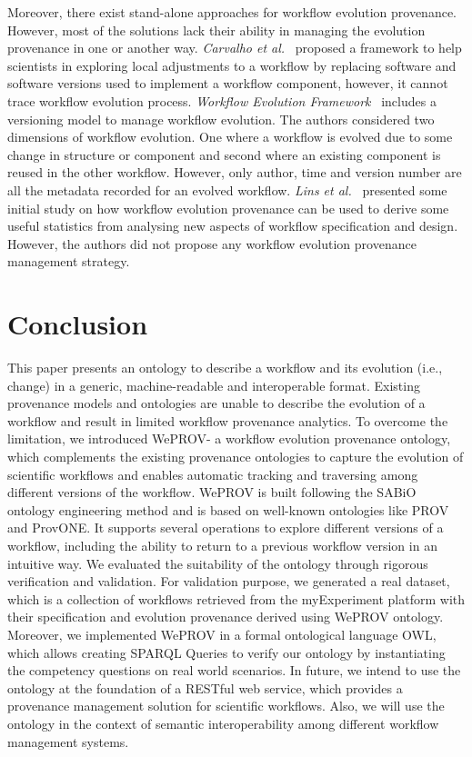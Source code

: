 \documentclass[ao]{iosart2x}
\begin{document}
Moreover, there exist stand-alone approaches for workflow evolution provenance. However, most of the solutions lack their ability in managing the evolution provenance in one or another way. 
\textit{Carvalho et al.}~\citep{carvalho2018semantic} proposed a framework to help scientists in exploring local adjustments to a workflow by replacing software and software versions used to implement a workflow component, however, it cannot trace workflow evolution process. 
\textit{Workflow Evolution Framework}~\citep{barga2010provenance, withana2010versioning} includes a versioning model to manage workflow evolution. The authors considered two dimensions of workflow evolution. One where a workflow is evolved due to some change in structure or component and second where an existing component is reused in the other workflow. However, only author, time and version number are all the metadata recorded for an evolved workflow.
\textit{Lins et al.}~\citep{lins2008examining} presented some initial study on how workflow evolution provenance can be used to derive some useful statistics from analysing new aspects of workflow specification and design. However, the authors did not propose any workflow evolution provenance management strategy.

\section{Conclusion}
\label{sec:conclusion}

This paper presents an ontology to describe a workflow and its evolution (i.e., change) in a generic, machine-readable and interoperable format. 
Existing provenance models and ontologies are unable to describe the evolution of a workflow and result in limited workflow provenance analytics. 
To overcome the limitation, we introduced WePROV- a workflow evolution provenance ontology, which complements the existing provenance ontologies to capture the evolution of scientific workflows and enables automatic tracking and traversing among different versions of the workflow. 
WePROV is built following the SABiO ontology engineering method and is based on well-known ontologies like PROV and ProvONE. 
It supports several operations to explore different versions of a workflow, including the ability to return to a previous workflow version in an intuitive way.
We evaluated the suitability of the ontology through rigorous verification and validation.
For validation purpose, we generated a real dataset, which is a collection of workflows retrieved from the myExperiment platform with their specification and evolution provenance derived using WePROV ontology.
Moreover, we implemented WePROV in a formal ontological language OWL, which allows creating SPARQL Queries to verify our ontology by instantiating the competency questions on real world scenarios.
In future, we intend to use the ontology at the foundation of a RESTful web service, which provides a provenance management solution for scientific workflows. Also, we will use the ontology in the context of semantic interoperability among different workflow management systems.
\end{document}
